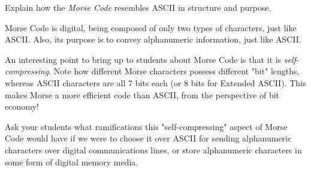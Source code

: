 

Explain how the {\it Morse Code} resembles ASCII in structure and purpose.







Morse Code is digital, being composed of only two types of characters, just like ASCII.  Also, its purpose is to convey alphanumeric information, just like ASCII.







An interesting point to bring up to students about Morse Code is that it is {\it self-compressing}.  Note how different Morse characters possess different "bit" lengths, whereas ASCII characters are all 7 bits each (or 8 bits for Extended ASCII).  This makes Morse a more efficient code than ASCII, from the perspective of bit economy!

Ask your students what ramifications this "self-compressing" aspect of Morse Code would have if we were to choose it over ASCII for sending alphanumeric characters over digital communications lines, or store alphanumeric characters in some form of digital memory media.




